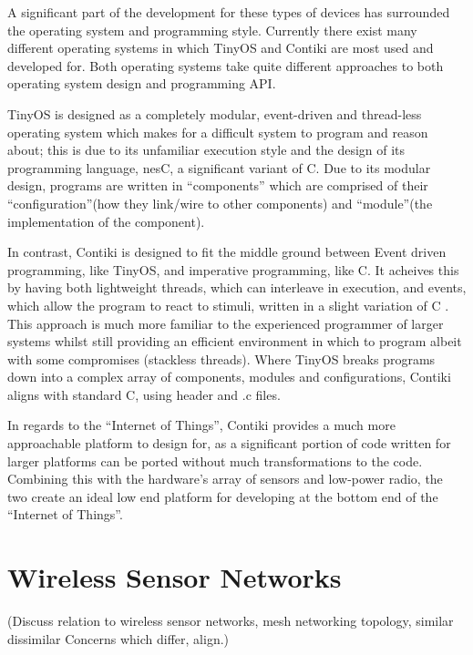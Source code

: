 A significant part of the development for these types of devices has surrounded the operating system and programming style. Currently there exist many different operating systems in which TinyOS and Contiki are most used and developed for. Both operating systems take quite different approaches to both operating system design and programming API. 

TinyOS is designed as a completely modular, event-driven and thread-less operating system which makes for a difficult system to program and reason about; this is due to its unfamiliar execution style and the design of its programming language, nesC, a significant variant of C. Due to its modular design, programs are written in ``components'' which are comprised of their ``configuration''(how they link/wire to other components) and ``module''(the implementation of the component). 

In contrast, Contiki is designed to fit the middle ground between Event driven programming, like TinyOS, and imperative programming, like C. It acheives this by having both lightweight threads, which can interleave in execution, and events, which allow the program to react to stimuli, written in a slight variation of C \cite{ContikiPaper}. This approach is much more familiar to the experienced programmer of larger systems whilst still providing an efficient environment in which to program albeit with some compromises (stackless threads). Where TinyOS breaks programs down into a complex array of components, modules and configurations, Contiki aligns with standard C, using header and .c files.

In regards to the ``Internet of Things'', Contiki provides a much more approachable platform to design for, as a significant portion of code written for larger platforms can be ported without much transformations to the code. Combining this with the hardware's array of sensors and low-power radio, the two create an ideal low end platform for developing at the bottom end of the ``Internet of Things''.

\section{Wireless Sensor Networks} %
\label{sec:wireless_sensor_networks}
(Discuss relation to wireless sensor networks, mesh networking topology, similar dissimilar
Concerns which differ, align.)


